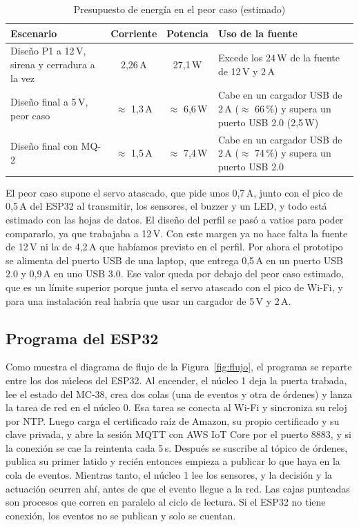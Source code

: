 \documentclass[manuscript,screen,nonacm]{acmart}
\begin{document}
\begin{table}[htbp]
\centering
\caption{Presupuesto de energía en el peor caso (estimado)}
\label{tab:corriente}
\footnotesize
\renewcommand{\arraystretch}{1.15}
\begin{tabular}{@{}L{4.6cm}ccL{3.8cm}@{}}
\toprule
\textbf{Escenario} & \textbf{Corriente} & \textbf{Potencia} & \textbf{Uso de la fuente} \\
\midrule
Diseño P1 a 12\,V, sirena y cerradura a la vez & 2,26\,A & 27,1\,W & Excede los 24\,W de la fuente de 12\,V y 2\,A \\
Diseño final a 5\,V, peor caso & $\approx$ 1,3\,A & $\approx$ 6,6\,W & Cabe en un cargador USB de 2\,A ($\approx$ 66\,\%) y supera un puerto USB 2.0 (2,5\,W) \\
Diseño final con MQ-2 & $\approx$ 1,5\,A & $\approx$ 7,4\,W & Cabe en un cargador USB de 2\,A ($\approx$ 74\,\%) y supera un puerto USB 2.0 \\
\bottomrule
\end{tabular}
\end{table}

El peor caso supone el servo atascado, que pide unos 0,7\,A, junto con el pico de 0,5\,A del ESP32 al transmitir, los sensores, el buzzer y un LED, y todo está estimado con las hojas de datos. El diseño del perfil se pasó a vatios para poder compararlo, ya que trabajaba a 12\,V. Con este margen ya no hace falta la fuente de 12\,V ni la de 4,2\,A que habíamos previsto en el perfil. Por ahora el prototipo se alimenta del puerto USB de una laptop, que entrega 0,5\,A en un puerto USB 2.0 y 0,9\,A en uno USB 3.0. Ese valor queda por debajo del peor caso estimado, que es un límite superior porque junta el servo atascado con el pico de Wi-Fi, y para una instalación real habría que usar un cargador de 5\,V y 2\,A.

\subsection{Programa del ESP32}
Como muestra el diagrama de flujo de la Figura~\ref{fig:flujo}, el programa se reparte entre los dos núcleos del ESP32. Al encender, el núcleo 1 deja la puerta trabada, lee el estado del MC-38, crea dos colas (una de eventos y otra de órdenes) y lanza la tarea de red en el núcleo 0. Esa tarea se conecta al Wi-Fi y sincroniza su reloj por NTP. Luego carga el certificado raíz de Amazon, su propio certificado y su clave privada, y abre la sesión MQTT con AWS IoT Core por el puerto 8883, y si la conexión se cae la reintenta cada 5\,s. Después se suscribe al tópico de órdenes, publica su primer latido y recién entonces empieza a publicar lo que haya en la cola de eventos. Mientras tanto, el núcleo 1 lee los sensores, y la decisión y la actuación ocurren ahí, antes de que el evento llegue a la red. Las cajas punteadas son procesos que corren en paralelo al ciclo de lectura. Si el ESP32 no tiene conexión, los eventos no se publican y solo se cuentan.
\end{document}
